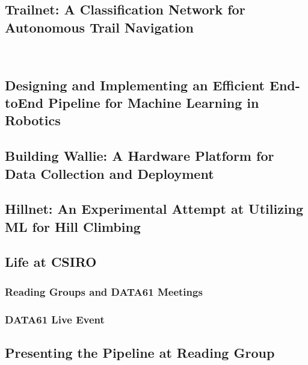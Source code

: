 \newpage
\subsection{Trailnet: A Classification Network for Autonomous Trail Navigation}

~\cite{trailNet}

\newpage
\subsection{Designing and Implementing an Efficient End-toEnd Pipeline for Machine Learning in Robotics}

\newpage
\subsection{Building Wallie: A Hardware Platform for Data Collection and Deployment}

\newpage
\subsection{Hillnet: An Experimental Attempt at Utilizing ML for Hill Climbing}

\newpage
\subsection{Life at CSIRO}

\subsubsection{Reading Groups and DATA61 Meetings}

\subsubsection{DATA61 Live Event}

\newpage
\subsection{Presenting the Pipeline at Reading Group}

